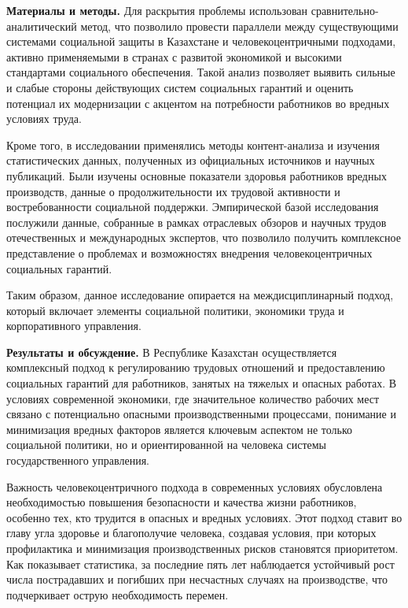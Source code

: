 \begin{multicols}{2}
{\bfseries Материалы и методы.} Для раскрытия проблемы использован
сравнительно-аналитический метод, что позволило провести параллели между
существующими системами социальной защиты в Казахстане и
человекоцентричными подходами, активно применяемыми в странах с развитой
экономикой и высокими стандартами социального обеспечения. Такой анализ
позволяет выявить сильные и слабые стороны действующих систем социальных
гарантий и оценить потенциал их модернизации с акцентом на потребности
работников во вредных условиях труда.

Кроме того, в исследовании применялись методы контент-анализа и изучения
статистических данных, полученных из официальных источников и научных
публикаций. Были изучены основные показатели здоровья работников вредных
производств, данные о продолжительности их трудовой активности и
востребованности социальной поддержки. Эмпирической базой исследования
послужили данные, собранные в рамках отраслевых обзоров и научных трудов
отечественных и международных экспертов, что позволило получить
комплексное представление о проблемах и возможностях внедрения
человекоцентричных социальных гарантий.

Таким образом, данное исследование опирается на междисциплинарный
подход, который включает элементы социальной политики, экономики труда и
корпоративного управления.

{\bfseries Результаты и обсуждение.} В Республике Казахстан осуществляется
комплексный подход к регулированию трудовых отношений и предоставлению
социальных гарантий для работников, занятых на тяжелых и опасных
работах. В условиях современной экономики, где значительное количество
рабочих мест связано с потенциально опасными производственными
процессами, понимание и минимизация вредных факторов является ключевым
аспектом не только социальной политики, но и ориентированной на человека
системы государственного управления.

Важность человекоцентричного подхода в современных условиях обусловлена
необходимостью повышения безопасности и качества жизни работников,
особенно тех, кто трудится в опасных и вредных условиях. Этот подход
ставит во главу угла здоровье и благополучие человека, создавая условия,
при которых профилактика и минимизация производственных рисков
становятся приоритетом. Как показывает статистика, за последние пять лет
наблюдается устойчивый рост числа пострадавших и погибших при несчастных
случаях на производстве, что подчеркивает острую необходимость перемен.

\end{multicols}



